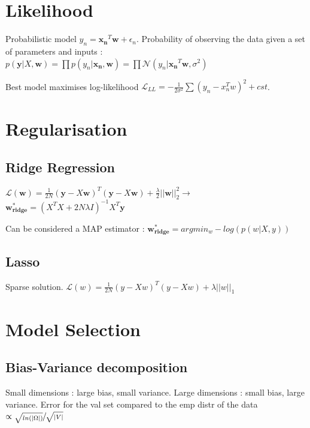 \section{Likelihood}
Probabilistic model $y_n = \mathbf{x_n}^T\mathbf{w} + \epsilon_n$.
Probability of observing the data given a set of parameters and inputs :
$p(\mathbf{y}|X, \mathbf{w}) = \prod p(y_n|\mathbf{x_n}, \mathbf{w})  = \prod \mathcal{N} (y_n | \mathbf{x_n}^T\mathbf{w}, \sigma^2)$

Best model maximises log-likelihood $\mathcal{L}_{LL} = -\frac{1}{2\sigma^2} \sum(y_n-x_n^Tw)^2+cst$.


\section{Regularisation}
\subsection{Ridge Regression}
$\mathcal{L}(\mathbf{w}) = \frac{1}{2N} (\mathbf{y} - X\mathbf{w})^T(\mathbf{y} - X\mathbf{w}) + \frac{\lambda}{2} ||\mathbf{w}||^2_2 \rightarrow$
$\mathbf{w^*_{ridge}} = (X^TX + 2N\lambda I)^{-1}X^T\mathbf{y}$\newline

Can be considered a MAP estimator : $\mathbf{w^*_{ridge}} = arg min_w - log(p(w|X,y))$

\subsection{Lasso}
Sparse solution.
$\mathcal{L}(w) = \frac{1}{2N} (y - Xw)^T(y - Xw) + \lambda ||w||_1 $

\section{Model Selection}
\subsection{Bias-Variance decomposition}
Small dimensions : large bias, small variance.
Large dimensions : small bias, large variance.
Error for the val set compared to the emp distr of the data $\propto \sfrac{\sqrt{ln(|\Omega|)}}{\sqrt{|V|}}$


